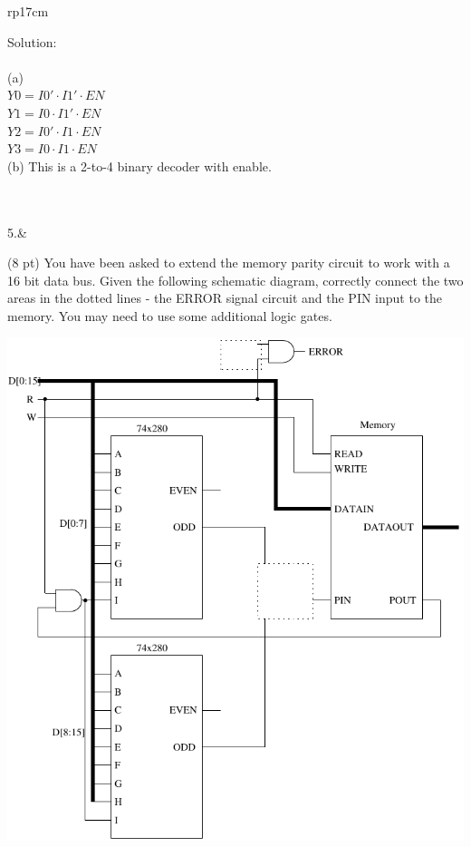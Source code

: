 \documentclass{article}
\begin{document}
\begin{longtable}[l]{rp{17cm}}
\begin{minipage}[t]{\linewidth}
Solution: \\ \\
(a)\\
$Y0 = I0' \cdot I1' \cdot EN$\\
$Y1 = I0 \cdot I1' \cdot EN$\\
$Y2 = I0' \cdot I1 \cdot EN$\\
$Y3 = I0 \cdot I1 \cdot EN$\\
(b) This is a 2-to-4 binary decoder with enable.\\ \\
\end{minipage}\\
\medskip
5.&\begin{minipage}[t]{\linewidth}(8 pt) You have been asked to extend the memory parity circuit to work with a 16 bit data bus.  Given the following schematic diagram, correctly connect the two areas in the dotted lines - the ERROR signal circuit and the PIN input to the memory.  You may need to use some additional logic gates.
\begin{center}
  \includegraphics[scale=0.5]{../XOR/Assessments/MemoryCircuitParityExtended}
\end{center}


\end{minipage}
\end{longtable}
\end{document}
